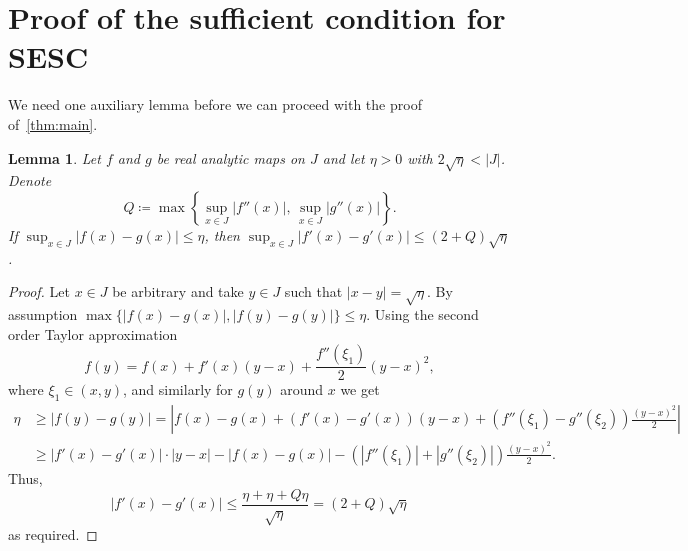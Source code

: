 \documentclass[11pt,a4paper]{article}
\def\cref#1{\ref{#1}}%
\newtheorem{lemma}[theorem]{Lemma}
\theoremstyle{definition}
\theoremstyle{remark}
\newcommand{\0}{\mathbf{0}}
\numberwithin{equation}{section}
\begin{document}
\section{Proof of the sufficient condition for SESC}\label{sec:ProofSufficientCond}

We need one auxiliary lemma before we can proceed with the proof of~\cref{thm:main}.

\begin{lemma}\label{thm:analyticity}
Let $f$ and $g$ be real analytic maps on $J$
and let $\eta>0$ with $2\sqrt{\eta}<|J|$.
Denote
 \[
   Q \coloneqq \max\left\{\sup_{x\in J} |f''(x)|,\, \sup_{x\in J}|g''(x)|\right\}.
 \]
If $\sup_{x\in J} |f(x)-g(x)| \leq \eta$, then $\sup_{x\in J} |f'(x)-g'(x)|\leq (2+Q)\sqrt{\eta}$.
\end{lemma}
\begin{proof}
Let $x\in J$ be arbitrary and take $y\in J$ such that $|x-y|=\sqrt{\eta}$. By assumption
$\max\{|f(x)-g(x)|,|f(y)-g(y)|\}\leq \eta$. Using the second order Taylor approximation 
\[
  f(y) = f(x) + f'(x)(y-x)+ \frac{f''(\xi_1)}{2}(y-x)^2,
\]
where $\xi_1\in(x,y)$, and similarly for $g(y)$ around $x$ we get
\begin{align*}
  \eta &\geq |f(y)-g(y)| =
  \left|f(x)-g(x)+(f'(x)-g'(x))(y-x)+(f''(\xi_1)-g''(\xi_2))\frac{(y-x)^2}{2}\right|\\
 &\geq |f'(x)-g'(x)|\cdot|y-x|-|f(x)-g(x)|-(|f''(\xi_1)|+|g''(\xi_2)|)\frac{(y-x)^2}{2}.
\end{align*}
  Thus,
  \[
    |f'(x)-g'(x)| \leq \frac{\eta+\eta+Q \eta}{\sqrt{\eta}} = (2+Q)\sqrt{\eta}
  \]
  as required.
\end{proof}
\end{document}
